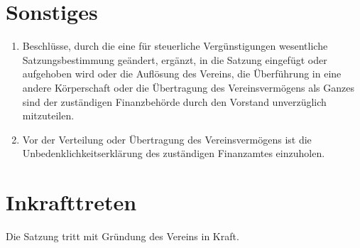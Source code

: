 \documentclass[ngerman]{article}
\begin{document}
\section{Sonstiges}
\begin{enumerate}
\item Beschlüsse, durch die eine für steuerliche Vergünstigungen wesentliche Satzungsbestimmung geändert, ergänzt, in die Satzung eingefügt oder aufgehoben wird oder die Auflösung des Vereins, die Überführung in eine andere Körperschaft oder die Übertragung des Vereinsvermögens
als Ganzes sind der zuständigen Finanzbehörde durch den Vorstand unverzüglich mitzuteilen.
\item Vor der Verteilung oder Übertragung des Vereinsvermögens ist die Unbedenklichkeitserklärung des zuständigen Finanzamtes einzuholen.
\end{enumerate}

\section{Inkrafttreten}

Die Satzung tritt mit Gründung des Vereins in Kraft.
\end{document}

